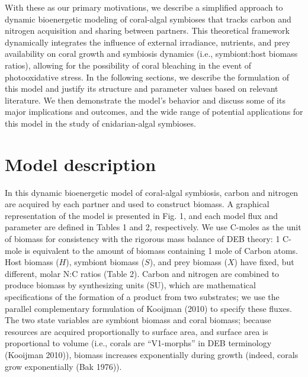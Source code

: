 \documentclass[]{elsarticle} %
\begin{document}
With these as our primary motivations, we describe a simplified approach
to dynamic bioenergetic modeling of coral-algal symbioses that tracks
carbon and nitrogen acquisition and sharing between partners. This
theoretical framework dynamically integrates the influence of external
irradiance, nutrients, and prey availability on coral growth and
symbiosis dynamics (i.e., symbiont:host biomass ratios), allowing for
the possibility of coral bleaching in the event of photooxidative
stress. In the following sections, we describe the formulation of this
model and justify its structure and parameter values based on relevant
literature. We then demonstrate the model's behavior and discuss some of
its major implications and outcomes, and the wide range of potential
applications for this model in the study of cnidarian-algal symbioses.

\section{Model description}\label{model-description}

In this dynamic bioenergetic model of coral-algal symbiosis, carbon and
nitrogen are acquired by each partner and used to construct biomass. A
graphical representation of the model is presented in Fig. 1, and each
model flux and parameter are defined in Tables 1 and 2, respectively. We
use C-moles as the unit of biomass for consistency with the rigorous
mass balance of DEB theory: 1 C-mole is equivalent to the amount of
biomass containing 1 mole of Carbon atoms. Host biomass (\(H\)),
symbiont biomass (\(S\)), and prey biomass (\(X\)) have fixed, but
different, molar N:C ratios (Table 2). Carbon and nitrogen are combined
to produce biomass by synthesizing units (SU), which are mathematical
specifications of the formation of a product from two substrates; we use
the parallel complementary formulation of Kooijman (2010) to specify
these fluxes. The two state variables are symbiont biomass and coral
biomass; because resources are acquired proportionally to surface area,
and surface area is proportional to volume (i.e., corals are
``V1-morphs'' in DEB terminology (Kooijman 2010)), biomass increases
exponentially during growth (indeed, corals grow exponentially (Bak
1976)).
\end{document}
